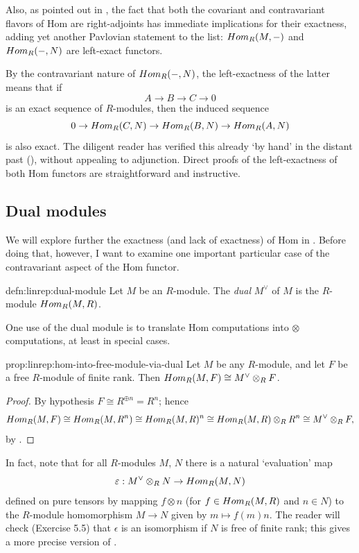 Also, as pointed out in , the fact that both
the covariant and contravariant flavors of Hom are right-adjoints has
immediate implications for their exactness, adding yet another
Pavlovian statement to the list: $Hom_R(M, -)$ and $Hom_R(-, N)$ are
left-exact functors.

By the contravariant nature of $Hom_R(-, N)$, the left-exactness of
the latter means that if
\[
  A \to B \to C \to 0
\]
is an exact sequence of $R$-modules, then the induced sequence
\[
  0 \to Hom_R(C, N) \to Hom_R(B, N) \to Hom_R(A, N)
\]
is also exact. The diligent reader has verified this already `by hand'
in the distant past
(), without
appealing to adjunction. Direct proofs of the left-exactness of both
Hom functors are straightforward and instructive.

\subsection{Dual modules}
\label{subsec:linrep:dual-modules}
We will explore further the exactness (and lack of exactness) of Hom
in
. Before
doing that, however, I want to examine one important particular case
of the contravariant aspect of the Hom functor.

\begin{defn}{}{defn:linrep:dual-module}
  Let $M$ be an $R$-module. The \emph{dual} $M^\vee$ of $M$ is the
  $R$-module $Hom_R(M, R)$.
\end{defn}

One use of the dual module is to translate Hom computations into
$\otimes$ computations, at least in special cases.

\begin{prop}{}{prop:linrep:hom-into-free-module-via-dual}
  Let $M$ be any $R$-module, and let $F$ be a free $R$-module of
  finite rank. Then $Hom_R(M, F) \cong M^\vee \otimes_R F$.
\end{prop}
\begin{proof}
  By hypothesis $F \cong R^{\oplus n} = R^n$; hence
  \[
    Hom_R(M, F) \cong Hom_R(M, R^n) \cong Hom_R(M, R)^n \cong
    Hom_R(M, R) \otimes_R R^n \cong M^\vee \otimes_R F,
  \]
  by .
\end{proof}

In fact, note that for all $R$-modules $M$, $N$ there is a natural
`evaluation' map
\[
  \varepsilon : M^\vee \otimes_R N \to Hom_R(M, N)
\]
defined on pure tensors by mapping $f \otimes n$ (for
$f \in Hom_R(M, R)$ and $n \in N$) to the $R$-module homomorphism
$M \to N$ given by $m \mapsto f(m)n$. The reader will check (Exercise
5.5) that $\epsilon$ is an isomorphism if $N$ is free of finite rank;
this gives a more precise version of .


